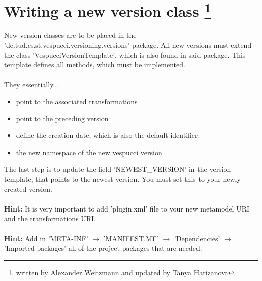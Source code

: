 \documentclass[12pt,a4paper,oneside]{report}
\begin{document}
\section*{Writing a new version class \footnote{written by Alexander Weitzmann and updated by Tanya Harizanova}}
New version classes are to be placed in the 'de.tud.cs.st.vespucci.versioning.versions' package. All new versions must extend the class 'VespucciVersionTemplate', which is also found in said package. This template defines all methods, which must be implemented. \\ \\ They essentially... 
\begin{itemize}
	\item point to the associated transformations
	\item point to the preceding version
	\item define the creation date, which is also the default identifier.
	\item the new namespace of the new vespucci version
\end{itemize}
\medskip
The last step is to update the field 'NEWEST\_VERSION' in the version template, that points to the newest version. You must set this to your newly created version.\\ \\
\textbf{Hint:} It is very important to add 'plugin.xml' file to your new metamodel URI and the transformations URI.\\ \\
\textbf{Hint:} Add in 'META-INF' $\rightarrow$ 'MANIFEST.MF' $\rightarrow$ 'Dependencies' $\rightarrow$ 'Imported packages' all of the project packages that are needed.
\end{document}
